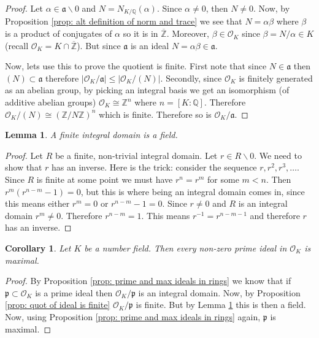 \documentclass[11pt,a4paper]{report}
\theoremstyle{plain}
\newtheorem{lem}[subsection]{Lemma}
\newtheorem{cor}[subsection]{Corollary}
\theoremstyle{definition}
\theoremstyle{definition}
\newcommand{\ZZ}{\mathbb{Z}}
\def\QQ{\mathbb{Q}}
\def \Nm {N_{K/\QQ}}
\def\gothp{\mathfrak{p}}
\def \a{\alpha}
\def \OO {\mathcal{O}}
\def \ov{\overline}
\def\gotha{\mathfrak{a}}
\begin{document}
	\begin{proof}
		Let $\a \in \gotha \backslash 0$ and $N=\Nm(\a)$. Since $\a \neq 0$, then $N \neq 0$. Now, by Proposition \ref{prop: alt definition of norm and trace} we see that $N=\a \beta$ where $\beta$ is a product of conjugates of $\a$ so it is in $\ov{\ZZ}$. Moreover, $\beta \in \OO_K$ since $\beta=N/\a \in K$ (recall $\OO_K=K \cap \ov{\ZZ}$). But since $\gotha$ is an ideal $N=\a \beta \in \gotha$.
		
		Now, lets use this to prove the quotient is finite. First note that since $N \in \gotha$ then $(N) \subset \gotha$ therefore $|\OO_K /\gotha| \leq |\OO_K / (N)|$. Secondly, since $\OO_K$ is finitely generated as an abelian group, by picking an integral basis we get an isomorphism (of additive abelian groups) $\OO_K \cong \ZZ^n$ where $n=[K:\QQ]$. Therefore $\OO_K/(N) \cong (\ZZ/N\ZZ)^n$ which is finite. Therefore so is $\OO_K/\gotha$.
	\end{proof}
	
	
	
	\begin{lem}\label{lem: fin int dom is field}
		A finite integral domain is a field.
	\end{lem}
	
	
	\begin{proof}
		Let $R$ be a finite, non-trivial integral domain. Let $r \in R\backslash 0$. We need to show that $r$ has an inverse. Here is the trick: consider the sequence $r,r^2,r^3,\dots.$ Since $R$ is finite at some point we must have $r^n=r^m$ for some $m<n$. Then $r^m(r^{n-m}-1)=0$, but this is where being an integral domain comes in, since this means either $r^m=0$ or $r^{n-m}-1=0$. Since $r \neq 0$ and $R$ is an integral domain $r^m \neq 0$. Therefore $r^{n-m}=1$. This means $r^{-1}=r^{n-m-1}$ and therefore $r$ has an inverse.
	\end{proof}
	
	\begin{cor}\label{cor: prim ideal is maximal}
		Let $K$ be a number field. Then every non-zero prime ideal in $\OO_K$ is maximal.
	\end{cor}
	
	\begin{proof}
		By Proposition \ref{prop: prime and max ideals in rings} we know that if $\gothp \subset \OO_K$ is a prime ideal then $\OO_K/\gothp$ is an integral domain. Now, by Proposition \ref{prop: quot of ideal is finite} $\OO_K /\gothp$ is finite. But by Lemma \ref{lem: fin int dom is field} this is then a field. Now, using Proposition \ref{prop: prime and max ideals in rings} again, $\gothp$ is maximal.
	\end{proof}
	
\end{document}
